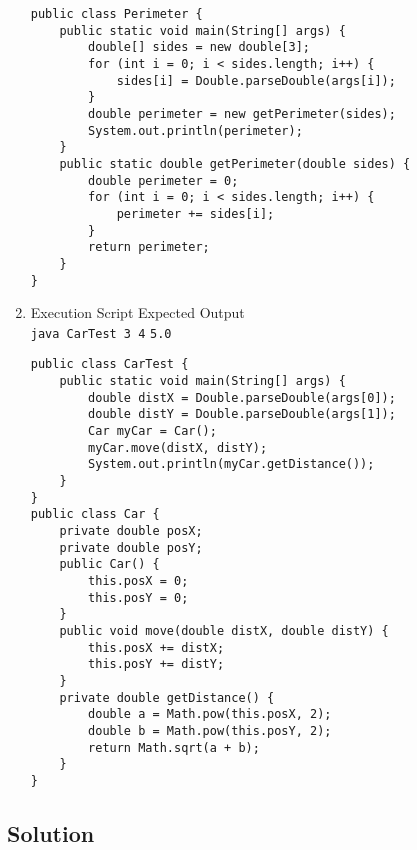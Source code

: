 \documentclass[12pt,letterpaper,twoside]{article}
\begin{document}
\begin{enumerate}[label=\textbf{(\alph*)}]
\begin{lstlisting}
public class Perimeter {
	public static void main(String[] args) {
		double[] sides = new double[3];
		for (int i = 0; i < sides.length; i++) {
			sides[i] = Double.parseDouble(args[i]);
		}
		double perimeter = new getPerimeter(sides);
		System.out.println(perimeter);
	}
	public static double getPerimeter(double sides) {
		double perimeter = 0;
		for (int i = 0; i < sides.length; i++) {
			perimeter += sides[i];
		}
		return perimeter;
	}
}
\end{lstlisting}

\newpage

\item Execution Script \hfill Expected Output\\
\texttt{java CarTest 3 4} \hfill \texttt{5.0}

\begin{lstlisting}
public class CarTest {
	public static void main(String[] args) {
		double distX = Double.parseDouble(args[0]);
		double distY = Double.parseDouble(args[1]);
		Car myCar = Car();
		myCar.move(distX, distY);
		System.out.println(myCar.getDistance());
	}
}
public class Car {
	private double posX;
	private double posY;
	public Car() {
		this.posX = 0;
		this.posY = 0;
	}
	public void move(double distX, double distY) {
		this.posX += distX;
		this.posY += distY;
	}
	private double getDistance() {
		double a = Math.pow(this.posX, 2);
		double b = Math.pow(this.posY, 2);
		return Math.sqrt(a + b);
	}
}
\end{lstlisting}

\end{enumerate}

\newpage

\subsection*{Solution}
\end{document}
